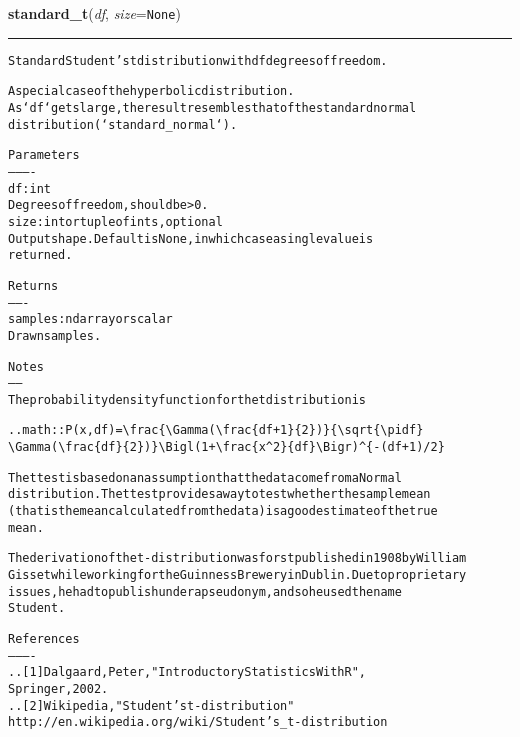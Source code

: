     \label{trunk:qstkutil:bollinger:standard_t}

    \vspace{0.5ex}

\hspace{.8\funcindent}\begin{boxedminipage}{\funcwidth}

    \raggedright \textbf{standard\_t}(\textit{df}, \textit{size}={\tt None})

    \vspace{-1.5ex}

    \rule{\textwidth}{0.5\fboxrule}
\setlength{\parskip}{2ex}
\begin{alltt}
Standard Student's t distribution with df degrees of freedom.

A special case of the hyperbolic distribution.
As `df` gets large, the result resembles that of the standard normal
distribution (`standard\_normal`).

Parameters
----------
df : int
    Degrees of freedom, should be {\textgreater} 0.
size : int or tuple of ints, optional
    Output shape. Default is None, in which case a single value is
    returned.

Returns
-------
samples : ndarray or scalar
    Drawn samples.

Notes
-----
The probability density function for the t distribution is

.. math:: P(x, df) = {\textbackslash}frac\{{\textbackslash}Gamma({\textbackslash}frac\{df+1\}\{2\})\}\{{\textbackslash}sqrt\{{\textbackslash}pi df\}
          {\textbackslash}Gamma({\textbackslash}frac\{df\}\{2\})\}{\textbackslash}Bigl( 1+{\textbackslash}frac\{x{\textasciicircum}2\}\{df\} {\textbackslash}Bigr){\textasciicircum}\{-(df+1)/2\}

The t test is based on an assumption that the data come from a Normal
distribution. The t test provides a way to test whether the sample mean
(that is the mean calculated from the data) is a good estimate of the true
mean.

The derivation of the t-distribution was forst published in 1908 by William
Gisset while working for the Guinness Brewery in Dublin. Due to proprietary
issues, he had to publish under a pseudonym, and so he used the name
Student.

References
----------
.. [1] Dalgaard, Peter, "Introductory Statistics With R",
       Springer, 2002.
.. [2] Wikipedia, "Student's t-distribution"
       http://en.wikipedia.org/wiki/Student's\_t-distribution


\end{alltt}
\end{boxedminipage}
